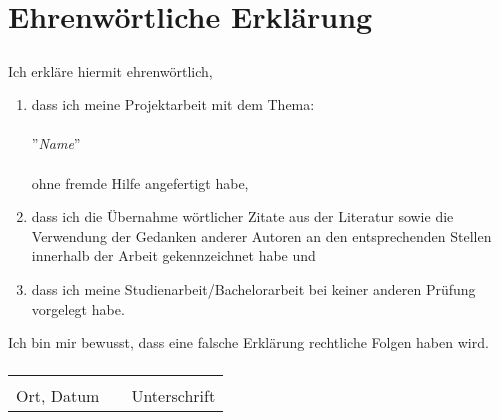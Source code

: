 \documentclass[12pt,a4paper]{scrartcl}
\begin{document}
	\newpage
	\lstlistoflistings

\newpage
	\section{Ehrenwörtliche Erklärung}
\begin{align*}
\textbf{}
\end{align*}
Ich erkläre hiermit ehrenwörtlich,\\
\begin{enumerate}
\item[1.]dass ich meine Projektarbeit mit dem Thema:\\
\\
''\textit{Name}''\\
\\
ohne fremde Hilfe angefertigt habe,
\item[2.]dass ich die Übernahme wörtlicher Zitate aus der Literatur sowie die Verwendung der Gedanken anderer Autoren an den entsprechenden Stellen innerhalb der Arbeit gekennzeichnet habe und
\item[3.]dass ich meine Studienarbeit/Bachelorarbeit bei keiner anderen Prüfung vorgelegt habe.
\end{enumerate}
Ich bin mir bewusst, dass eine falsche Erklärung rechtliche Folgen haben wird.\\
\begin{align*}
\textbf{}
\end{align*}
\begin{tabular}{lp{2em}l}
 \hspace{5cm}   && \hspace{4cm} \\\cline{1-1}\cline{3-3}
 Ort, Datum     && Unterschrift
\end{tabular}
\end{document}
